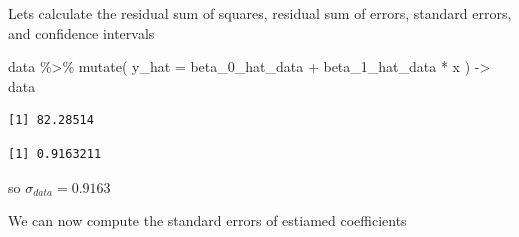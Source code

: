 \documentclass[
  letterpaper,
  DIV=11,
  numbers=noendperiod]{scrreprt}
\newenvironment{Shaded}{\begin{snugshade}}{\end{snugshade}}
\newcommand{\AttributeTok}[1]{\textcolor[rgb]{0.40,0.45,0.13}{#1}}
\newcommand{\DecValTok}[1]{\textcolor[rgb]{0.68,0.00,0.00}{#1}}
\newcommand{\FunctionTok}[1]{\textcolor[rgb]{0.28,0.35,0.67}{#1}}
\newcommand{\NormalTok}[1]{\textcolor[rgb]{0.00,0.23,0.31}{#1}}
\newcommand{\OtherTok}[1]{\textcolor[rgb]{0.00,0.23,0.31}{#1}}
\newcommand{\SpecialCharTok}[1]{\textcolor[rgb]{0.37,0.37,0.37}{#1}}
\begin{document}
Lets calculate the residual sum of squares, residual sum of errors,
standard errors, and confidence intervals

\begin{Shaded}
\begin{Highlighting}[]
\NormalTok{data }\SpecialCharTok{\%\textgreater{}\%} 
  \FunctionTok{mutate}\NormalTok{(}
    \AttributeTok{y\_hat =}\NormalTok{ beta\_0\_hat\_data }\SpecialCharTok{+}\NormalTok{ beta\_1\_hat\_data }\SpecialCharTok{*}\NormalTok{ x}
\NormalTok{  ) }\OtherTok{{-}\textgreater{}}\NormalTok{ data}
\end{Highlighting}
\end{Shaded}

\begin{Shaded}
\end{Shaded}

\begin{verbatim}
[1] 82.28514
\end{verbatim}

\begin{Shaded}
\end{Shaded}

\begin{verbatim}
[1] 0.9163211
\end{verbatim}

so \(\sigma_{data} = 0.9163\)

We can now compute the standard errors of estiamed coefficients

\begin{Shaded}
\end{Shaded}
\end{document}

